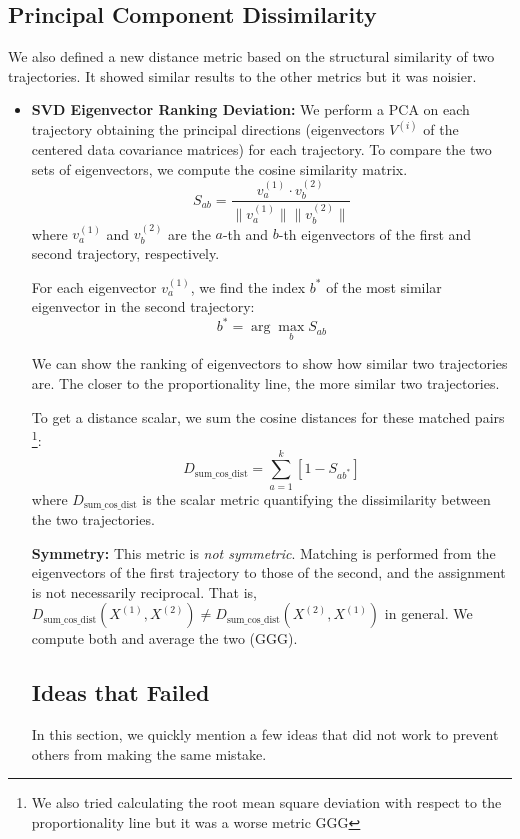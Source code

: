 \documentclass[a4paper,12pt]{article}
\begin{document}
\subsection{Principal Component Dissimilarity}
\label{subsec:pca_distance} 
We also defined a new distance metric based on the structural similarity of two trajectories. It showed similar results to the other metrics but it was noisier.
\begin{itemize}
        
    \item \textbf{SVD Eigenvector Ranking Deviation:} We perform a PCA on each trajectory obtaining the principal directions (eigenvectors $V^{(i)}$ of the centered data covariance matrices) for each trajectory. To compare the two sets of eigenvectors, we compute the cosine similarity matrix.
    \[
    S_{ab} = \frac{v^{(1)}_a \cdot v^{(2)}_b}{\|v^{(1)}_a\| \|v^{(2)}_b\|}
    \]
    where $v^{(1)}_a$ and $v^{(2)}_b$ are the $a$-th and $b$-th eigenvectors of the first and second trajectory, respectively.

    For each eigenvector $v^{(1)}_a$, we find the index $b^*$ of the most similar eigenvector in the second trajectory:
    \[
    b^* = \arg\max_b S_{ab}
    \]

    We can show the ranking of eigenvectors to show how similar two trajectories are. The closer to the proportionality line, the more similar two trajectories.

    To get a distance scalar, we sum the cosine distances for these matched pairs \footnote{We also tried calculating the root mean square deviation with respect to the proportionality line but it was a worse metric GGG}:
    \[
    D_{\text{sum\_cos\_dist}} = \sum_{a=1}^k \left[1 - S_{a b^*}\right]
    \]
    where $D_{\text{sum\_cos\_dist}}$ is the scalar metric quantifying the dissimilarity between the two trajectories.

    \textbf{Symmetry:} This metric is \emph{not symmetric}. Matching is performed from the eigenvectors of the first trajectory to those of the second, and the assignment is not necessarily reciprocal. That is, $D_{\text{sum\_cos\_dist}}(X^{(1)}, X^{(2)}) \neq D_{\text{sum\_cos\_dist}}(X^{(2)}, X^{(1)})$ in general. We compute both and average the two (GGG).

\subsection{Ideas that Failed}
\label{subsec:appendix_failed_ideas} %
In this section, we quickly mention a few ideas that did not work to prevent others from making the same mistake.


\end{itemize}
\end{document}
